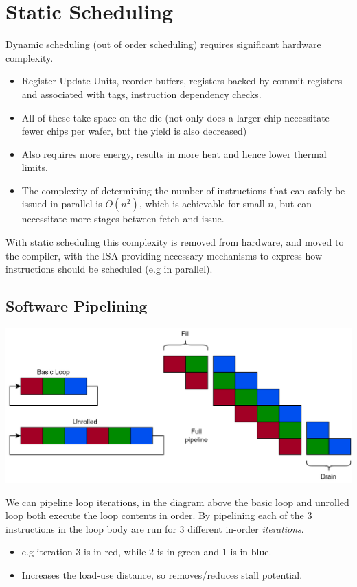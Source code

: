 \chapter{Static Scheduling}

Dynamic scheduling (out of order scheduling) requires significant hardware complexity.
\begin{itemize}
    \item Register Update Units, reorder buffers, registers backed by commit registers and associated with tags, instruction dependency checks.
    \item All of these take space on the die (not only does a larger chip necessitate fewer chips per wafer, but the yield is also decreased)
    \item Also requires more energy, results in more heat and hence lower thermal limits.
    \item The complexity of determining the number of instructions that can safely be issued in parallel is $O(n^2)$, which is achievable for small $n$, but can necessitate more stages between fetch and issue.
\end{itemize}
With static scheduling this complexity is removed from hardware, and moved to the compiler, with the ISA providing necessary mechanisms to express how instructions should be scheduled (e.g in parallel).

\section{Software Pipelining}
\begin{center}
    \includegraphics[width=\textwidth]{static_scheduling/images/software_pipelining.drawio.png}
\end{center}

We can pipeline loop iterations, in the diagram above the basic loop and unrolled loop both execute the loop contents in order. By pipelining each of the 3 instructions in the loop body are run for 3 different in-order \textit{iterations}.
\begin{itemize}
    \item e.g iteration $3$ is in red, while $2$ is in green and $1$ is in blue.
    \item Increases the load-use distance, so removes/reduces stall potential.
\end{itemize}

